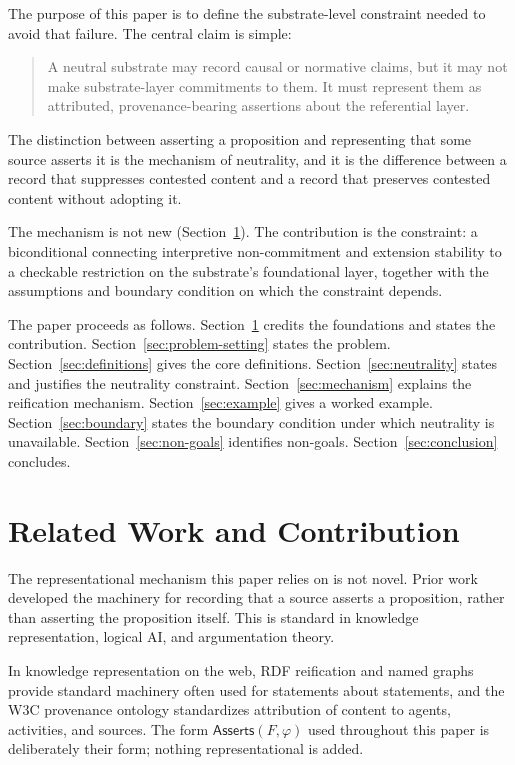 \documentclass[11pt]{article}
\theoremstyle{plain}
\theoremstyle{definition}
\theoremstyle{remark}
\newcommand{\SecRef}[1]{Section~\ref{#1}}
\newcommand{\Framework}{F}
\newcommand{\Asserts}{\mathsf{Asserts}}
\begin{document}
The purpose of this paper is to define the substrate-level constraint
needed to avoid that failure.
The central claim is simple:

\begin{quote}
  A neutral substrate may record causal or normative claims,
  but it may not make substrate-layer commitments to them.
  It must represent them as attributed, provenance-bearing assertions
  about the referential layer.
\end{quote}

The distinction between asserting a proposition and
representing that some source asserts it is the mechanism of neutrality,
and it is the difference between
a record that suppresses contested content and
a record that preserves contested content without adopting it.

The mechanism is not new (\SecRef{sec:related-work}).
The contribution is the constraint:
a biconditional connecting interpretive non-commitment and extension stability
to a checkable restriction on the substrate's foundational layer,
together with the assumptions and boundary condition on which the constraint depends.

The paper proceeds as follows.
\SecRef{sec:related-work} credits the foundations and states the contribution.
\SecRef{sec:problem-setting} states the problem.
\SecRef{sec:definitions} gives the core definitions.
\SecRef{sec:neutrality} states and justifies the neutrality constraint.
\SecRef{sec:mechanism} explains the reification mechanism.
\SecRef{sec:example} gives a worked example.
\SecRef{sec:boundary} states the boundary condition under which neutrality is unavailable.
\SecRef{sec:non-goals} identifies non-goals.
\SecRef{sec:conclusion} concludes.

\section{Related Work and Contribution}
\label{sec:related-work}

The representational mechanism this paper relies on is not novel.
Prior work developed the machinery for
recording that a source asserts a proposition,
rather than asserting the proposition itself.
This is standard in knowledge representation, logical AI, and argumentation theory.

In knowledge representation on the web,
RDF reification \citep{hayes2004rdf}
and named graphs \citep{carroll2005named}
provide standard machinery often used for
statements about statements, and the
W3C provenance ontology
\citep{lebo2013prov} standardizes attribution of content to
agents, activities,
and sources.
The form $\Asserts(\Framework,\varphi)$ used throughout this paper
is deliberately their form; nothing representational is added.
\end{document}
